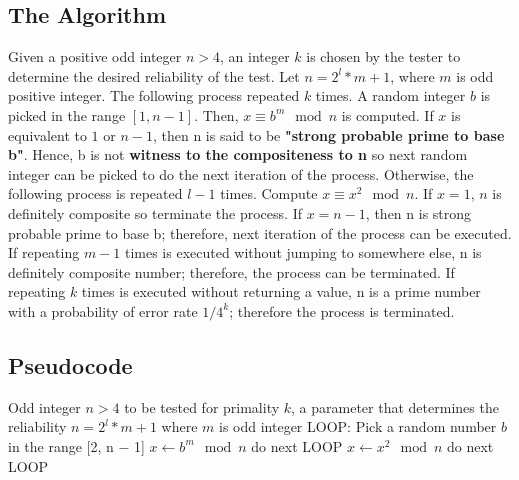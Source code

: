 \documentclass[conference]{IEEEtran}
\begin{document}
\subsection{The Algorithm}\label{AA}
Given a positive odd integer $n>4$, an integer $k$ is chosen by the tester to determine the desired reliability of the test. Let $n = 2^l*m+1$, where $m$ is odd positive integer. The following process repeated $k$ times. A random integer $b$ is picked in the range $[1,n-1]$. Then, $x \equiv b^m\mod{n}$ is computed. If $x$ is equivalent to  $1$ or $n-1$, then n is said to be \textbf{"strong probable prime to base b"}. Hence, b is not \textbf{witness to the compositeness to n} so next random integer can be picked to do the next iteration of the process. Otherwise,  the following process is repeated $l-1$ times. Compute $x \equiv x^2\mod{n}$. If $x=1$, $n$ is definitely composite so terminate the process. If $x=n-1$, then n is strong probable prime to base b; therefore, next iteration of the process can be executed. If repeating $m-1$ times is executed without jumping to somewhere else, n is definitely composite number; therefore, the process can be terminated. If repeating $k$ times is executed without returning a value, n is a prime number with a probability of error rate $1/4^k$; therefore the process is terminated.

\subsection*{Pseudocode}

\begin{algorithm}
\begin{algorithmic}
\REQUIRE Odd integer $n>4$ to be  tested for primality
\REQUIRE $k$, a parameter that determines the reliability 
\ENSURE  $n = 2^l*m+1$ where $m$ is odd integer
\STATE LOOP: 
\REPEAT
    \STATE Pick a random number $b$ in the range [2, n − 1]
    \STATE $x \leftarrow   b^m \mod{ n}$
        \STATE do next LOOP
    \ENDIF
    \REPEAT
        \STATE $x \leftarrow   x^2 \mod{ n}$
        \ENDIF
            \STATE do next LOOP
        \ENDIF



\end{algorithmic}
\end{algorithm}
\end{document}
